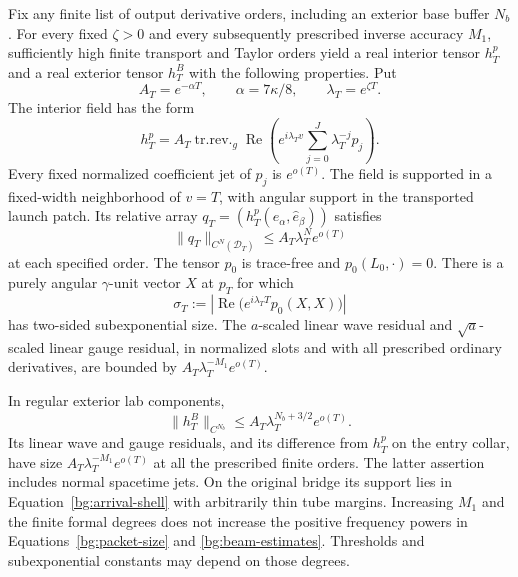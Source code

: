 \begin{proposition}\label{bg:packet}
Fix any finite list of output derivative orders, including an
exterior base buffer $N_b$.  For every fixed $\zeta>0$ and every
subsequently prescribed inverse accuracy $M_1$, sufficiently high
finite transport and Taylor orders yield a real interior tensor
$h_T^p$ and a real exterior tensor $h_T^B$ with the following
properties.  Put
\begin{equation}\label{bg:packet-scales}
       A_T=e^{-\alpha T},\qquad \alpha=7\kappa/8,
       \qquad\lambda_T=e^{\zeta T}.
\end{equation}
The interior field has the form
\begin{equation}\label{bg:packet-form}
 h_T^p=A_T\operatorname{tr.rev.}_g\operatorname{Re}
       \left(e^{i\lambda_Tv}\sum_{j=0}^{J}\lambda_T^{-j}p_j\right).
\end{equation}
Every fixed normalized coefficient jet of $p_j$ is $e^{o(T)}$.
The field is supported in a fixed-width neighborhood of $v=T$,
with angular support in the transported launch patch.  Its relative
array $q_T=(h_T^p(\hat e_\alpha,\hat e_\beta))$ satisfies
\begin{equation}\label{bg:packet-size}
              \|q_T\|_{C^N(\mathcal D_T)}
                    \le A_T\lambda_T^N e^{o(T)}
\end{equation}
at each specified order.  The tensor $p_0$ is trace-free and
$p_0(L_0,\cdot)=0$.  There is a purely angular $\gamma$-unit vector
$X$ at $p_T$ for which
\begin{equation}\label{bg:polarization}
 \sigma_T:=\left|\operatorname{Re}
        \bigl(e^{i\lambda_TT}p_0(X,X)\bigr)\right|
\end{equation}
has two-sided subexponential size.  The $a$-scaled linear wave
residual and $\sqrt a$-scaled linear gauge residual, in normalized
slots and with all prescribed ordinary derivatives, are bounded
by $A_T\lambda_T^{-M_1}e^{o(T)}$.

In regular exterior lab components,
\begin{equation}\label{bg:beam-estimates}
 \|h_T^B\|_{C^{N_b}}\le A_T\lambda_T^{N_b+3/2}e^{o(T)}.
\end{equation}
Its linear wave and gauge residuals, and its difference from
$h_T^p$ on the entry collar, have size
$A_T\lambda_T^{-M_1}e^{o(T)}$ at all the prescribed finite orders.
The latter assertion includes normal spacetime jets.  On the
original bridge its support lies in Equation~\eqref{bg:arrival-shell}
with arbitrarily thin tube margins.  Increasing $M_1$ and the
finite formal degrees does not increase the positive frequency
powers in Equations~\eqref{bg:packet-size} and
\eqref{bg:beam-estimates}.  Thresholds and subexponential constants
may depend on those degrees.
\end{proposition}

